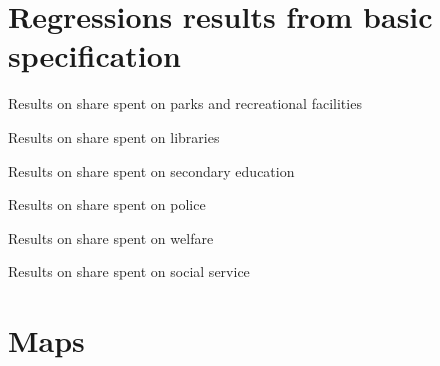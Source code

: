 \documentclass[12pt]{article}
\begin{document}




\newpage

\appendix

\section{Regressions results from basic specification}

\begin{table}[h!]
    \centering
    \scriptsize
  
    \caption{Results on share spent on parks and recreational facilities}
    \label{tab: parks}
\end{table}

\begin{table}[h!]
    \centering
    \scriptsize
  
    \caption{Results on share spent on libraries}
    \label{tab: libraries}
\end{table}

\newpage

\begin{table}[h!]
    \centering
    \scriptsize
  
    \caption{Results on share spent on secondary education}
    \label{tab: education}
\end{table}

\begin{table}[h!]
    \centering
    \scriptsize
  
    \caption{Results on share spent on police}
    \label{tab: police}
\end{table}

\newpage

\begin{table}[h!]
    \centering
    \scriptsize
  
    \caption{Results on share spent on welfare}
    \label{tab: welfare}
\end{table}

\begin{table}[h!]
    \centering
    \scriptsize
  
    \caption{Results on share spent on social service}
    \label{tab: social service}
\end{table}

\newpage

\section{Maps}
\end{document}
